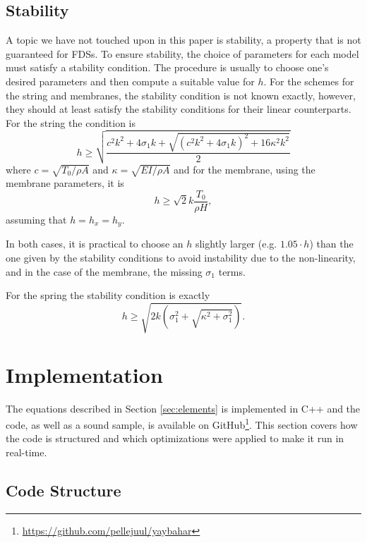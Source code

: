 \documentclass{article}
\begin{document}
\subsection{Stability}

A topic we have not touched upon in this paper is stability, a property that is not guaranteed for FDSs.
To ensure stability, the choice of parameters for each model must satisfy a stability condition.
The procedure is usually to choose one's desired parameters and then compute a suitable value for $h$.
For the schemes for the string and membranes, the stability condition is not known exactly, however, they should at least satisfy the stability conditions for their linear counterparts.
For the string the condition is\cite{willemsen_real-time_2019}
\begin{equation}
    h \geq \sqrt{\frac{c^2 k^2 + 4\sigma_1k + \sqrt{(c^2 k^2 + 4\sigma_1k)^2 + 16 \kappa^2 k^2}}{2}}
\end{equation}
where $c = \sqrt{T_0 / \rho A}$ and $\kappa = \sqrt{EI / \rho A}$ and for the membrane, using the membrane parameters, it is\cite[Chapter~11]{bilbao_numerical_2009}
\begin{equation}
    h \geq \sqrt{2} k \frac{T_0}{\rho H},
\end{equation}
assuming that $h = h_x = h_y$.

In both cases, it is practical to choose an $h$ slightly larger (e.g. $1.05 \cdot h$) than the one given by the stability conditions to avoid instability due to the non-linearity, and in the case of the membrane, the missing $\sigma_1$ terms.

For the spring the stability condition is exactly\cite{bilbao_modular_2009}
\begin{equation}
    h \geq \sqrt{2 k \left( \sigma_1^2 + \sqrt{\kappa^2 + \sigma_1^2} \right)}.
\end{equation}

\section{Implementation}
\label{sec:implementation}

The equations described in Section \ref{sec:elements} is implemented in C++ and the code, as well as a sound sample, is available on GitHub\footnote{\url{https://github.com/pellejuul/yaybahar}}.
This section covers how the code is structured and which optimizations were applied to make it run in real-time.

\subsection{Code Structure}
\end{document}
